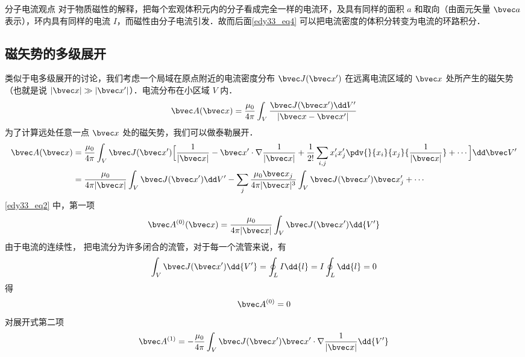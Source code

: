
\begin{lemma}{分子电流观点}
对于物质磁性的解释，把每个宏观体积元内的分子看成完全一样的电流环，及具有同样的面积 $a$ 和取向（由面元矢量 $\bvec a$ 表示），环内具有同样的电流 $I$，而磁性由分子电流引发．故而后面\autoref{edy33_eq4} 可以把电流密度的体积分转变为电流的环路积分．
\end{lemma}
\subsection{磁矢势的多级展开}
类似于电多级展开的讨论，我们考虑一个局域在原点附近的电流密度分布 $\bvec J(\bvec x')$ 在远离电流区域的 $\bvec x$ 处所产生的磁矢势（也就是说 $|\bvec x|\gg|\bvec x'|$）．电流分布在小区域 $V$ 内．
\begin{equation}
\bvec A(\bvec x)=\dfrac {\mu_0}{4\pi} \int_V \dfrac{ \bvec J(\bvec x^{\prime})\dd V^{\prime}}{|\bvec x - \bvec x'|}\label{edy33_eq1}
\end{equation}
为了计算远处任意一点 $\bvec x$ 处的磁矢势，我们可以做泰勒展开．
\begin{align}
\bvec A(\bvec x)&=\dfrac {\mu_0}{4\pi}\int_V \bvec J(\bvec x')\Big[\dfrac{1}{|\bvec x|}-\bvec x'\cdot\nabla \dfrac{1}{|\bvec x|}+\dfrac{1}{2!}\sum_{i,j}x_i^{\prime}x_j^{\prime}\pdv{}{x_i}{x_j}{\dfrac 1 {|\bvec x|}}+\cdots\Big]\dd \bvec V^{\prime}
\label{edy33_eq2_0}
\\
&=\dfrac{\mu_0}{4\pi|\bvec x|}\int_V \bvec J(\bvec x')\dd V'
-\sum_{j}\dfrac{\mu_0 \bvec x_j}{4\pi |\bvec x|^3}\int_V \bvec J(\bvec x')\bvec x'_j + \cdots
\label{edy33_eq2}
\end{align}
\autoref{edy33_eq2} 中，第一项
\begin{equation}
\bvec A^{(0)}(\bvec x)=\dfrac {\mu_0}{4\pi |\bvec x|}\int_V \bvec J(\bvec x')\dd{ V^{\prime}}\label{edy33_eq3}
\end{equation}
由于电流的连续性，%
把电流分为许多闭合的流管，对于每一个流管来说，有
\begin{equation}
\int_V \bvec J(\bvec x^{\prime}) \dd{V^{\prime}}=\oint_L I\dd{l}=I\oint_L \dd{l}=0\label{edy33_eq4}
\end{equation}
得\begin{equation}
\bvec A^{(0)}=0\label{edy33_eq5}
\end{equation}
对展开式第二项
\begin{equation}
\bvec A^{(1)}=-\dfrac{\mu_0 }{4\pi}\int_V \bvec J(\bvec x^{\prime})\bvec x^{\prime}\cdot\nabla\dfrac{1}{|\bvec x|}\dd{V^{\prime}}\label{edy33_eq6}
\end{equation}

